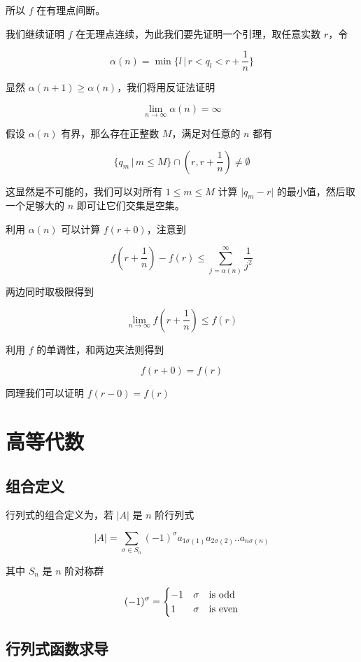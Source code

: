 \documentclass[12pt,a4paper]{ctexart}
\begin{document}
所以 $f$ 在有理点间断。

我们继续证明 $f$ 在无理点连续，为此我们要先证明一个引理，取任意实数 $r$，令

\[
\alpha(n) = \min \{ l \,\vert\, r < q_l < r + \frac{1}{n}\}
\]

显然 $\alpha(n+1) \ge \alpha(n)$，我们将用反证法证明

\[
\lim_{n \to \infty} \alpha(n) = \infty
\]

假设 $\alpha(n)$ 有界，那么存在正整数 $M$，满足对任意的 $n$ 都有

\[
\{ q_m \,\vert\, m \le M \} \cap (r, r+\frac{1}{n}) \ne \emptyset
\]

这显然是不可能的，我们可以对所有 $1 \le m \le M$ 计算 $\lvert q_m - r\rvert$ 的最小值，然后取一个足够大的 $n$ 即可让它们交集是空集。

利用 $\alpha(n)$ 可以计算 $f(r+0)$，注意到 

\[
f(r+\frac{1}{n}) - f(r) \le \sum_{j=\alpha(n)}^{\infty}\frac{1}{j^2}
\]

两边同时取极限得到

\[
\lim_{n \to \infty}f(r + \frac{1}{n}) \le f(r)
\]

利用 $f$ 的单调性，和两边夹法则得到

\[
f(r+0) = f(r)
\]

同理我们可以证明 $f(r-0) = f(r)$

\section{高等代数}

\subsection{组合定义}

行列式的组合定义为，若  $|A|$ 是 $n$ 阶行列式

\[
|A| = \sum_{\sigma \in S_n} (-1)^{\sigma} a_{1\sigma(1)}a_{2\sigma(2)}..a_{n\sigma(n)}
\]

其中 $S_n$ 是 $n$ 阶对称群

\[
(-1)^{\sigma} = \begin{cases}
    -1 & \sigma \text{\quad is odd} \\
    1 & \sigma \text{\quad is even} \\
\end{cases}
\]

\subsection{行列式函数求导}
\end{document}

